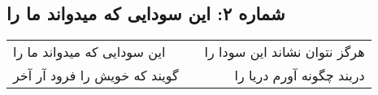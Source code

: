 \begin{center}
\section*{شماره ۲: این سودایی که میدواند ما را}
\label{sec:002}
\begin{longtable}{l p{0.5cm} r}
این سودایی که میدواند ما را
&&
هرگز نتوان نشاند این سودا را
\\
گویند که خویش را فرود آر آخر
&&
دربند چگونه آورم دریا را
\\
\end{longtable}
\end{center}
